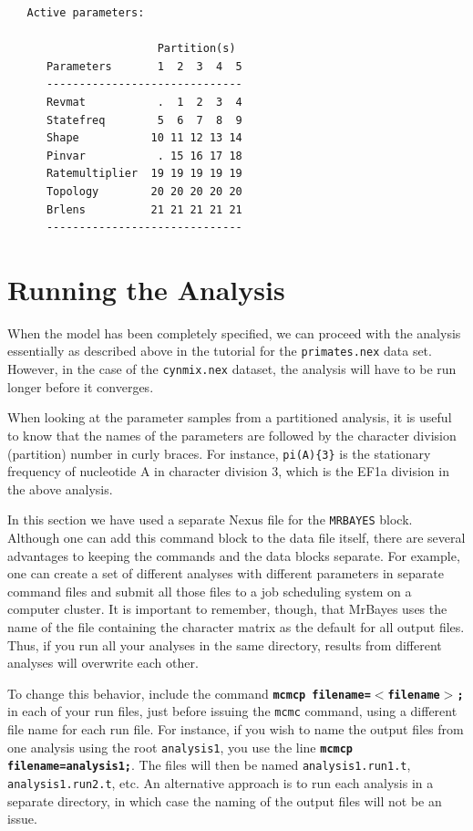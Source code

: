 \documentclass[12pt]{book}
\newcommand{\ttt}[1]{\texttt{#1}}
\newcommand{\tb}[1]{\ttt{\textbf{#1}}}
\begin{document}
\begin{singlespacing}
\footnotesize
\begin{verbatim}
   Active parameters:
 
                       Partition(s)
      Parameters       1  2  3  4  5
      ------------------------------
      Revmat           .  1  2  3  4
      Statefreq        5  6  7  8  9
      Shape           10 11 12 13 14
      Pinvar           . 15 16 17 18
      Ratemultiplier  19 19 19 19 19
      Topology        20 20 20 20 20
      Brlens          21 21 21 21 21
      ------------------------------
\end{verbatim}
\normalsize
\end{singlespacing}

\section{Running the Analysis}

When the model has been completely specified, we can proceed with the analysis essentially as
described above in the tutorial for the \ttt{primates.nex} data set. However, in the case of the
\ttt{cynmix.nex} dataset, the analysis will have to be run longer before it converges.

When looking at the parameter samples from a partitioned analysis, it is useful to know that the
names of the parameters are followed by the character division (partition) number in curly braces.
For instance, \ttt{pi(A)\{3\}} is the stationary frequency of nucleotide A in character division 3,
which is the EF1a division in the above analysis.

In this section we have used a separate Nexus file for the \ttt{MRBAYES} block. Although one can
add this command block to the data file itself, there are several advantages to keeping the
commands and the data blocks separate. For example, one can create a set of different analyses with
different parameters in separate command files and submit all those files to a job scheduling
system on a computer cluster. It is important to remember, though, that MrBayes uses the name of
the file containing the character matrix as the default for all output files. Thus, if you run all
your analyses in the same directory, results from different analyses will overwrite each other.

To change this behavior, include the command \tb{mcmcp filename=$<$filename$>$;} in each of your
run files, just before issuing the \ttt{mcmc} command, using a different file name for each run
file. For instance, if you wish to name the output files from one analysis using the root
\ttt{analysis1}, you use the line \tb{mcmcp filename=analysis1;}. The files will then be named
\ttt{analysis1.run1.t}, \ttt{analysis1.run2.t}, etc. An alternative approach is to run each
analysis in a separate directory, in which case the naming of the output files will not be an
issue.
\end{document}
